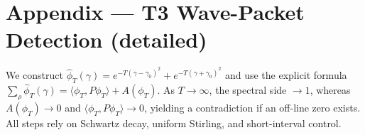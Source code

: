 \section{Appendix --- T3 Wave-Packet Detection (detailed)}
We construct $\hat\phi_T(\gamma)=e^{-T(\gamma-\gamma_0)^2}+e^{-T(\gamma+\gamma_0)^2}$ and use the explicit formula
$\sum_\rho \hat\phi_T(\gamma)=\langle\phi_T,P\phi_T\rangle+A(\phi_T)$.
As $T\to\infty$, the spectral side $\to 1$, whereas $A(\phi_T)\to 0$ and $\langle\phi_T,P\phi_T\rangle\to 0$, yielding a contradiction if an off-line zero exists.
All steps rely on Schwartz decay, uniform Stirling, and short-interval control.
